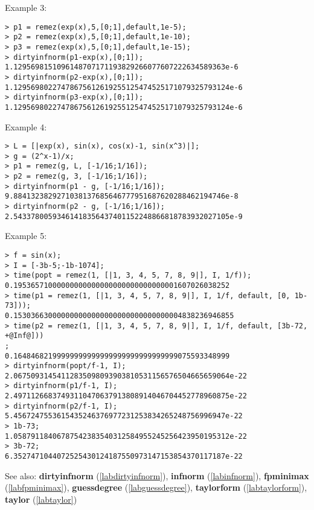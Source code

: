 \noindent Example 3: 
\begin{center}\begin{minipage}{15cm}\begin{Verbatim}[frame=single]
> p1 = remez(exp(x),5,[0;1],default,1e-5);
> p2 = remez(exp(x),5,[0;1],default,1e-10);
> p3 = remez(exp(x),5,[0;1],default,1e-15);
> dirtyinfnorm(p1-exp(x),[0;1]);
1.1295698151096148707171193829266077607222634589363e-6
> dirtyinfnorm(p2-exp(x),[0;1]);
1.12956980227478675612619255125474525171079325793124e-6
> dirtyinfnorm(p3-exp(x),[0;1]);
1.12956980227478675612619255125474525171079325793124e-6
\end{Verbatim}
\end{minipage}\end{center}
\noindent Example 4: 
\begin{center}\begin{minipage}{15cm}\begin{Verbatim}[frame=single]
> L = [|exp(x), sin(x), cos(x)-1, sin(x^3)|];
> g = (2^x-1)/x;
> p1 = remez(g, L, [-1/16;1/16]);
> p2 = remez(g, 3, [-1/16;1/16]);
> dirtyinfnorm(p1 - g, [-1/16;1/16]);
9.8841323829271038137685646777951687620288462194746e-8
> dirtyinfnorm(p2 - g, [-1/16;1/16]);
2.54337800593461418356437401152248866818783932027105e-9
\end{Verbatim}
\end{minipage}\end{center}
\noindent Example 5: 
\begin{center}\begin{minipage}{15cm}\begin{Verbatim}[frame=single]
> f = sin(x);
> I = [-3b-5;-1b-1074];
> time(popt = remez(1, [|1, 3, 4, 5, 7, 8, 9|], I, 1/f));
0.19536571000000000000000000000000000001607026038252
> time(p1 = remez(1, [|1, 3, 4, 5, 7, 8, 9|], I, 1/f, default, [0, 1b-73]));
0.153036630000000000000000000000000000004838236946855
> time(p2 = remez(1, [|1, 3, 4, 5, 7, 8, 9|], I, 1/f, default, [3b-72, +@Inf@]))
;
0.16484682199999999999999999999999999999075593348999
> dirtyinfnorm(popt/f-1, I);
2.06750931454112835098093903810531156576504665659064e-22
> dirtyinfnorm(p1/f-1, I);
2.49711266837493110470637913808914046704452778960875e-22
> dirtyinfnorm(p2/f-1, I);
5.4567247553615435246376977231253834265248756996947e-22
> 1b-73;
1.05879118406787542383540312584955245256423950195312e-22
> 3b-72;
6.3527471044072525430124187550973147153854370117187e-22
\end{Verbatim}
\end{minipage}\end{center}
See also: \textbf{dirtyinfnorm} (\ref{labdirtyinfnorm}), \textbf{infnorm} (\ref{labinfnorm}), \textbf{fpminimax} (\ref{labfpminimax}), \textbf{guessdegree} (\ref{labguessdegree}), \textbf{taylorform} (\ref{labtaylorform}), \textbf{taylor} (\ref{labtaylor})

